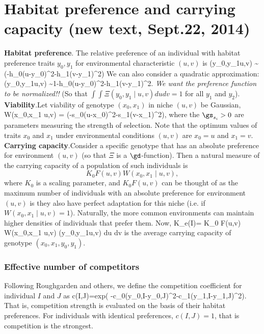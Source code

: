 \documentclass{article}
\begin{document}
\newpage
\section{Habitat preference and carrying capacity (new text, Sept.22, 2014)}

{\bf Habitat preference}.\quad
The relative preference of an individual with habitat preference
traits $y_0,y_1$ for environmental characteristic $(u,v)$ is 
	\be 
	\Xi(y_0,y_1\mid u,v) \sim \exp(-h_0(u-y_0)^2-h_1(v-y_1)^2)
	\ee
We can also consider a quadratic approximation:
	\be \label{quad}
	\Xi(y_0,y_1\mid u,v) \sim 1-h_0(u-y_0)^2-h_1(v-y_1)^2.
	\ee
{\em We want the preference function to be normalized!!} (So that $\int \int \Xi(y_0,y_1\mid u,v) du dv=1$
for all $y_1$ and $y_2$).\\

{\bf Viability}.\quad Let viability of genotype $(x_0,x_1)$ in niche $(u,v)$ be Gaussian,
\be
		W(x_0,x_1 \mid u,v) = \exp(-s_0(u-x_0)^2-s_1(v-x_1)^2),
\ee
where the $\gs_{s_i}>0$ are parameters measuring the strength of
selection.  Note that the optimum values of traits $x_0$ and $x_1$
under environmental conditions $(u,v)$ are $x_0 = u$ and $x_1 = v$.\\

{\bf Carrying capacity}.\quad Consider a specific genotype that has an absolute
preference for environment $(u,v)$ (so that $\Xi$ is a $\gd$-function). Then a natural
measure of the carrying capacity of a population of such individuals is
\[
    K_0 F(u,v) W(x_0,x_1 \mid u,v),
\]
where $K_0$ is a scaling parameter, and $K_0 F(u,v)$ can be thought of as the maximum
number of individuals with an absolute preference for environment $(u,v)$ is they
also have perfect adaptation for this niche (i.e. if $W(x_0,x_1 \mid u,v)=1$).
Naturally, the more common environments can maintain higher densities of individuals
that prefer them. Now,
\be
    K_e(I)= K_0 \int \int F(u,v) W(x_0,x_1 \mid u,v) \Xi(y_0,y_1\mid u,v) du dv
\ee
is the average carrying capacity of genotype $(x_0,x_1, y_0, y_1)$.


\subsubsection{Effective number of competitors}

Following Roughgarden and others, we define the competition coefficient for individual $I$ and $J$
as
\bs
\be
c(I,J)=exp( -c_0(y_{0,I}-y_{0,J})^2-c_1(y_{1,I}-y_{1,J})^2).
\ee
That is, competition strength is evaluated  on the basis of their habitat preferences.
For individuals with identical preferences, $c(I,J)=1$, that is competition is the strongest.
\end{document}
